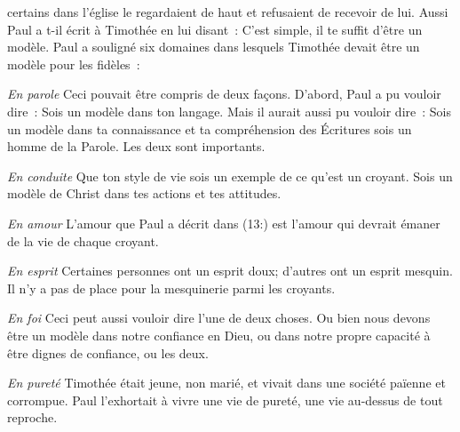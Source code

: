 certains dans l'église
 le regardaient de haut et refusaient de recevoir de lui.
 Aussi Paul a t-il écrit à Timothée en lui disant~: 
 \og C'est simple, il te suffit d'être un modèle. \fg{}
 Paul a souligné six domaines dans lesquels Timothée
 devait être un modèle pour les fidèles~:


\emph{En parole} \ocadr
 Ceci pouvait être compris de deux façons.
 D'abord, Paul a pu vouloir dire~: 
 \og Sois un modèle dans ton langage. \fg{}
 Mais il aurait aussi pu vouloir dire~: 
 \og Sois un modèle dans ta connaissance et ta compréhension des Écritures
 \ocadr sois un homme de la Parole. \fg{} Les deux sont importants.

\emph{En conduite} \ocadr
 Que ton style de vie sois un exemple de ce qu'est un croyant.
 Sois un modèle de Christ dans tes actions et tes attitudes.

\emph{En amour} \ocadr
 L'amour que Paul a décrit dans (13:) 
 est l'amour qui devrait émaner de la vie de chaque croyant.

\emph{En esprit} \ocadr
 Certaines personnes ont un esprit doux; d'autres ont un esprit mesquin.
 Il n'y a pas de place pour la mesquinerie parmi les croyants.

\emph{En foi} \ocadr
 Ceci peut aussi vouloir dire l'une de deux choses.
 Ou bien nous devons être un modèle dans notre confiance en Dieu,
 ou dans notre propre capacité à être dignes de confiance, ou les deux.

\emph{En pureté} \ocadr
 Timothée était jeune, non marié, et vivait dans une société païenne
 et corrompue. Paul l'exhortait à vivre une vie de pureté,
 une vie au-dessus de tout reproche.



\dvrule





